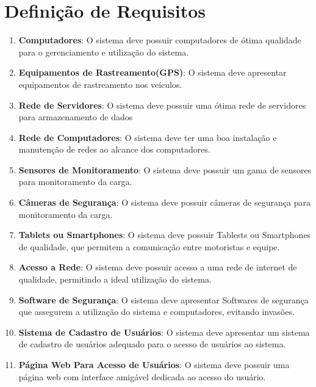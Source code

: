 \section{Definição de Requisitos}
\begin{enumerate}
	\item \textbf{Computadores}: O sistema deve possuir computadores de ótima qualidade para o gerenciamento e utilização do sistema.
	
	\item \textbf{Equipamentos de Rastreamento(GPS)}: O sistema deve apresentar equipamentos de rastreamento nos veículos.
	
	\item \textbf{Rede de Servidores}: O sistema deve possuir uma ótima rede de servidores para armazenamento de dados
	
	\item \textbf{Rede de Computadores}: O sistema deve ter uma boa instalação e manutenção de redes ao alcance dos computadores.
	
	\item \textbf{Sensores de Monitoramento}: O sistema deve possuir um gama de sensores para monitoramento da carga.
	
	\item \textbf{Câmeras de Segurança}: O sistema deve possuir câmeras de segurança para monitoramento da carga.
	
	\item \textbf{Tablets ou Smartphones}: O sistema deve possuir Tablests ou Smartphones de qualidade, que permitem a comunicação entre motoristas e equipe.
	
	\item \textbf{Acesso a Rede}: O sistema deve possuir acesso a uma rede de internet de qualidade, permitindo a ideal utilização do sistema.
	
	\item \textbf{Software de Segurança}: O sistema deve apresentar Softwares de segurança que assegurem a utilização do sistema e computadores, evitando invasões.
	
	\item \textbf{Sistema de Cadastro de Usuários}: O sistema deve apresentar um sistema de cadastro de usuários adequado para o acesso de usuários ao sistema.
	
	\item \textbf{Página Web Para Acesso de Usuários}: O sistema deve possuir uma página web com interface amigável dedicada ao acesso do usuário.
	

\end{enumerate}
